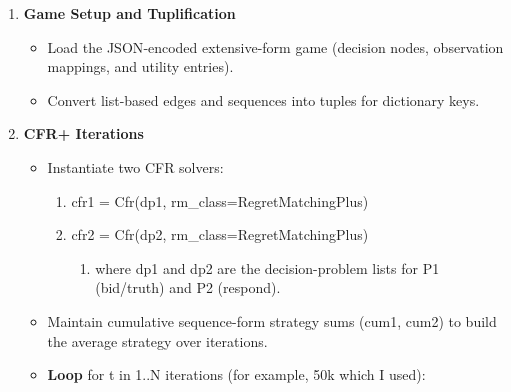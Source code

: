 \documentclass[
]{article}
\begin{document}
\begin{enumerate}
\def\labelenumi{\arabic{enumi}.}
\item
  \textbf{Game Setup and Tuplification}

  \begin{itemize}
  \item
    Load the JSON‑encoded extensive-form game (decision nodes,
    observation mappings, and utility entries).
  \item
    Convert list-based edges and sequences into tuples for dictionary
    keys.
  \end{itemize}
\item
  \textbf{CFR+ Iterations}

  \begin{itemize}
  \item
    Instantiate two CFR solvers:

    \begin{enumerate}
    \def\labelenumii{\arabic{enumii}.}
    \item
      cfr1 = Cfr(dp1, rm\_class=RegretMatchingPlus)
    \item
      cfr2 = Cfr(dp2, rm\_class=RegretMatchingPlus)

      \begin{enumerate}
      \def\labelenumiii{\arabic{enumiii}.}
      \item
        where dp1 and dp2 are the decision-problem lists for P1
        (bid/truth) and P2 (respond).
      \end{enumerate}
    \end{enumerate}
  \item
    Maintain cumulative sequence-form strategy sums (cum1, cum2) to
    build the average strategy over iterations.
  \item
    \textbf{Loop} for t in 1..N iterations (for example, 50k which I
    used):


\end{itemize}
\end{enumerate}
\end{document}
